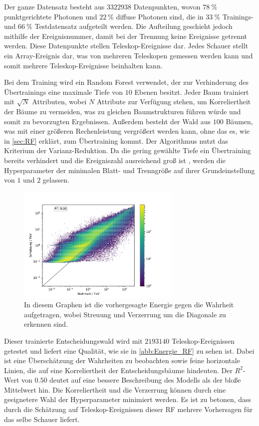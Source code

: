 Der ganze Datensatz besteht aus $\num{3322938}$ Datenpunkten, wovon $\SI{78}{\percent}$ punktgerichtete Photonen und $\SI{22}{\percent}$ diffuse Photonen sind,
die in $\SI{33}{\percent}$ Trainings- und $\SI{66}{\percent}$ Testdatensatz aufgeteilt werden.
Die Aufteilung geschieht jedoch mithilfe der Ereignisnummer, damit bei der Trennung keine Ereignisse getrennt werden.
Diese Datenpunkte stellen Teleskop-Ereignisse dar.
Jedes Schauer stellt ein Array-Ereignis dar, was von mehreren Teleskopen gemessen werden kann und somit mehrere Teleskop-Ereignisse beinhalten kann.

Bei dem Training wird ein Random Forest verwendet, der zur Verhinderung des Übertrainings eine maximale Tiefe von $10$ Ebenen besitzt.
Jeder Baum trainiert mit $\sqrt{N}$ Attributen, wobei $N$ Attribute zur Verfügung stehen, um Korreliertheit der Bäume zu vermeiden,
was zu gleichen Baumstrukturen führen würde und somit zu bevorzugten Ergebnissen.
Außerdem besteht der Wald aus $100$ Bäumen, was mit einer größeren Rechenleistung vergrößert werden kann, ohne
das es, wie in \autoref{sec:RF} erklärt, zum Übertraining kommt.
Der Algorithmus nutzt das Kriterium der Varianz-Reduktion. Da die gering gewählte Tiefe
ein Übertraining bereits verhindert und die Ereigniszahl ausreichend groß ist , werden die Hyperparameter
der minimalen Blatt- und Trenngröße auf ihrer Grundeinstellung von $1$ und $2$ gelassen.

\begin{figure}
  \includegraphics[width=0.7\textwidth]{Plots/RF.pdf}
  \centering
  \caption{In diesem Graphen ist die vorhergesagte Energie gegen die Wahrheit aufgetragen, wobei Streuung und Verzerrung um die
          Diagonale zu erkennen sind.}
  \label{abb:Energie_RF}
\end{figure}
Dieser trainierte Entscheidungswald wird mit $\num{2193140}$ Teleskop-Ereignissen getestet und liefert eine Qualität, wie sie in \autoref{abb:Energie_RF} zu sehen ist.
Dabei ist eine Überschätzung der Wahrheiten zu beobachten sowie feine horizontale Linien, die auf eine Korreliertheit der Entscheidungsbäume hindeuten.
Der $R^2$-Wert von $\num{0.50}$ deutet auf eine bessere Beschreibung des Modells als der bloße Mittelwert hin.
Die Korreliertheit und die Verzerrung können durch eine geeignetere Wahl der Hyperparameter minimiert werden.
Es ist zu betonen, dass durch die Schätzung auf Teleskop-Ereignissen dieser RF mehrere Vorhersagen für das selbe Schauer liefert.

